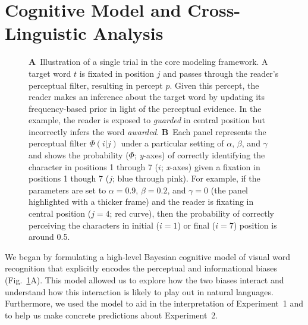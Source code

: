 \documentclass[doc,biblatex]{apa7}
\begin{document}
\section{Cognitive Model and Cross-Linguistic Analysis}

\begin{figure}
\vspace*{2pt}
\caption{\textbf{A}~Illustration of a single trial in the core modeling framework. A target word $t$ is fixated in position $j$ and passes through the reader's perceptual filter, resulting in percept $p$. Given this percept, the reader makes an inference about the target word by updating its frequency-based prior in light of the perceptual evidence. In the example, the reader is exposed to \textit{guarded} in central position but incorrectly infers the word \textit{awarded}. \textbf{B}~Each panel represents the perceptual filter $\Phi(i|j)$ under a particular setting of $\alpha$, $\beta$, and $\gamma$ and shows the probability ($\Phi$; \textit{y}-axes) of correctly identifying the character in positions 1 through 7 ($i$; \textit{x}-axes) given a fixation in positions 1 though 7 ($j$; blue through pink). For example, if the parameters are set to $\alpha=0.9$, $\beta=0.2$, and $\gamma=0$ (the panel highlighted with a thicker frame) and the reader is fixating in central position ($j=4$; red curve), then the probability of correctly perceiving the characters in initial ($i=1$) or final ($i=7$) position is around 0.5.}
\label{fig01}
\end{figure}

We began by formulating a high-level Bayesian cognitive model of visual word recognition that explicitly encodes the perceptual and informational biases (Fig.~\ref{fig01}A). This model allowed us to explore how the two biases interact and understand how this interaction is likely to play out in natural languages. Furthermore, we used the model to aid in the interpretation of Experiment~1 and to help us make concrete predictions about Experiment~2.
\end{document}
